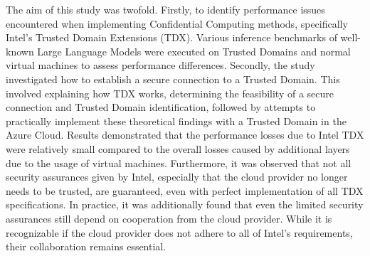 
\Abstract
The aim of this study was twofold. Firstly, to identify performance issues encountered when implementing Confidential Computing methods, specifically Intel's Trusted Domain Extensions (TDX). Various inference benchmarks of well-known Large Language Models were executed on Trusted Domains and normal virtual machines to assess performance differences. Secondly, the study investigated how to establish a secure connection to a Trusted Domain. This involved explaining how TDX works, determining the feasibility of a secure connection and Trusted Domain identification, followed by attempts to practically implement these theoretical findings with a Trusted Domain in the Azure Cloud. Results demonstrated that the performance losses due to Intel TDX were relatively small compared to the overall losses caused by additional layers due to the usage of virtual machines. Furthermore, it was observed that not all security assurances given by Intel, especially that the cloud provider no longer needs to be trusted, are guaranteed, even with perfect implementation of all TDX specifications. In practice, it was additionally found that even the limited security assurances still depend on cooperation from the cloud provider. While it is recognizable if the cloud provider does not adhere to all of Intel's requirements, their collaboration remains essential.